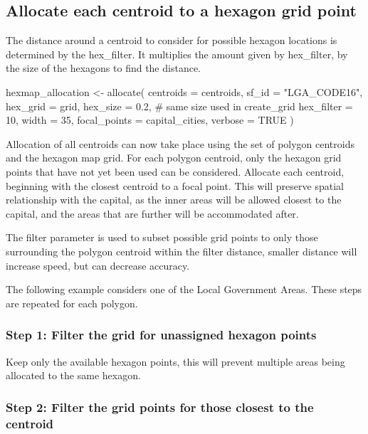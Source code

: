 \hypertarget{allocate-each-centroid-to-a-hexagon-grid-point}{%
\subsection{Allocate each centroid to a hexagon grid
point}\label{allocate-each-centroid-to-a-hexagon-grid-point}}

The distance around a centroid to consider for possible hexagon
locations is determined by the hex\_filter. It multiplies the amount
given by hex\_filter, by the size of the hexagons to find the distance.

\begin{Schunk}
\begin{Sinput}
hexmap_allocation <- allocate(
  centroids = centroids,
  sf_id = "LGA_CODE16",
  hex_grid = grid,
  hex_size = 0.2, # same size used in create_grid
  hex_filter = 10,
  width = 35,
  focal_points = capital_cities,
  verbose = TRUE
)
\end{Sinput}
\end{Schunk}

Allocation of all centroids can now take place using the set of polygon
centroids and the hexagon map grid. For each polygon centroid, only the
hexagon grid points that have not yet been used can be considered.
Allocate each centroid, beginning with the closest centroid to a focal
point. This will preserve spatial relationship with the capital, as the
inner areas will be allowed closest to the capital, and the areas that
are further will be accommodated after.

The filter parameter is used to subset possible grid points to only
those surrounding the polygon centroid within the filter distance,
smaller distance will increase speed, but can decrease accuracy.

The following example considers one of the Local Government Areas. These
steps are repeated for each polygon.

\hypertarget{step-1-filter-the-grid-for-unassigned-hexagon-points}{%
\subsubsection{Step 1: Filter the grid for unassigned hexagon
points}\label{step-1-filter-the-grid-for-unassigned-hexagon-points}}

Keep only the available hexagon points, this will prevent multiple areas
being allocated to the same hexagon.

\hypertarget{step-2-filter-the-grid-points-for-those-closest-to-the-centroid}{%
\subsubsection{Step 2: Filter the grid points for those closest to the
centroid}\label{step-2-filter-the-grid-points-for-those-closest-to-the-centroid}}

